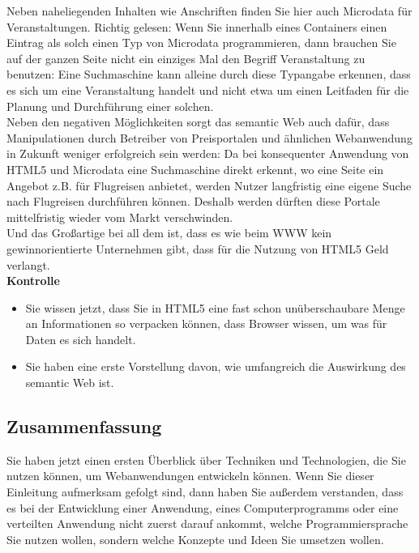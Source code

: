 Neben naheliegenden Inhalten wie Anschriften finden Sie hier auch Microdata für Veranstaltungen. Richtig gelesen: Wenn Sie innerhalb eines Containers einen Eintrag als solch einen Typ von Microdata programmieren, dann brauchen Sie auf der ganzen Seite nicht ein einziges Mal den Begriff Veranstaltung zu benutzen: Eine Suchmaschine kann alleine durch diese Typangabe erkennen, dass es sich um eine Veranstaltung handelt und nicht etwa um einen Leitfaden für die Planung und Durchführung einer solchen.\\

Neben den negativen Möglichkeiten sorgt das semantic Web auch dafür, dass Manipulationen durch Betreiber von Preisportalen und ähnlichen Webanwendung in Zukunft weniger erfolgreich sein werden: Da bei konsequenter Anwendung von HTML5 und Microdata eine Suchmaschine direkt erkennt, wo eine Seite ein Angebot z.B. für Flugreisen anbietet, werden Nutzer langfristig eine eigene Suche nach Flugreisen durchführen können. Deshalb werden dürften diese Portale mittelfristig wieder vom Markt verschwinden.\\

Und das Großartige bei all dem ist, dass es wie beim WWW kein gewinnorientierte Unternehmen gibt, dass für die Nutzung von HTML5 Geld verlangt.\\

\textbf{Kontrolle}

\begin{itemize}
	\item Sie wissen jetzt, dass Sie in HTML5 eine fast schon unüberschaubare Menge an Informationen so verpacken können, dass Browser wissen, um was für Daten es sich handelt. 
	\item Sie haben eine erste Vorstellung davon, wie umfangreich die Auswirkung des semantic Web ist.
\end{itemize}

\subsection{Zusammenfassung}

Sie haben jetzt einen ersten Überblick über Techniken und Technologien, die Sie nutzen können, um Webanwendungen entwickeln können. Wenn Sie dieser Einleitung aufmerksam gefolgt sind, dann haben Sie außerdem verstanden, dass es bei der Entwicklung einer Anwendung, eines Computerprogramms oder eine verteilten Anwendung nicht zuerst darauf ankommt, welche Programmiersprache Sie nutzen wollen, sondern welche Konzepte und Ideen Sie umsetzen wollen.\\

